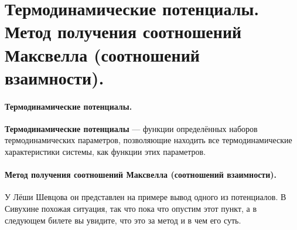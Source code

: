 \section{\normalsize  Термодинамические потенциалы. Метод получения соотношений Максвелла (соотношений взаимности). }
\paragraph{Термодинамические потенциалы.} \textbf{Термодинамические потенциалы} --- функции определённых наборов термодинамических параметров, позволяющие находить все термодинамические характеристики системы, как функции этих параметров.
\paragraph{Метод получения соотношений Максвелла (соотношений взаимности).} У Лёши Шевцова он представлен на примере вывод одного из потенциалов. В Сивухине похожая ситуация, так что пока что опустим этот пункт, а в следующем билете вы увидите, что это за метод и в чем его суть.
